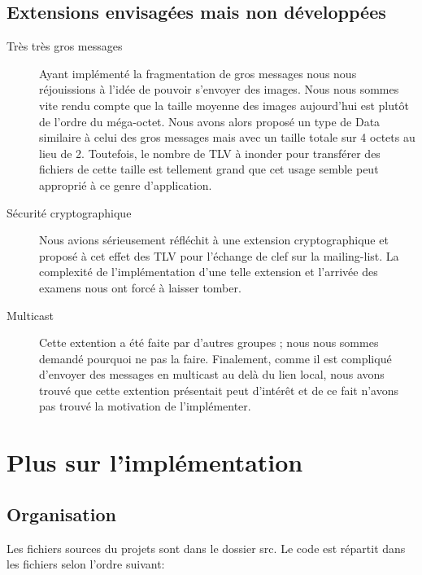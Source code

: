 \documentclass[a4paper,10pt]{article} %
\begin{document}
\subsection{Extensions envisagées mais non développées}

\begin{description}
\item[Très très gros messages] Ayant implémenté la fragmentation de gros messages nous nous réjouissions à l'idée de pouvoir s'envoyer des images. Nous nous sommes vite rendu compte que la taille moyenne des images aujourd'hui est plutôt de l'ordre du méga-octet. Nous avons alors proposé un type de Data similaire à celui des gros messages mais avec un taille totale sur 4 octets au lieu de 2. Toutefois, le nombre de TLV à inonder pour transférer des fichiers de cette taille est tellement grand que cet usage semble peut approprié à ce genre d'application.
\item[Sécurité cryptographique] Nous avions sérieusement réfléchit à une extension cryptographique et proposé à cet effet des TLV pour l'échange de clef sur la mailing-list. La complexité de l'implémentation d'une telle extension et l'arrivée des examens nous ont forcé à laisser tomber.
\item[Multicast] Cette extention a été faite par d'autres groupes ; nous nous sommes demandé pourquoi ne pas la faire. Finalement, comme il est compliqué d'envoyer des messages en multicast au delà du lien local, nous avons trouvé que cette extention présentait peut d'intérêt et de ce fait n'avons pas trouvé la motivation de l'implémenter.
\end{description}

\section{Plus sur l'implémentation\label{sec:implem}}
\subsection{Organisation}

Les fichiers sources du projets sont dans le dossier \textrm{src}. Le code est répartit dans les fichiers selon l'ordre suivant:
\end{document}
